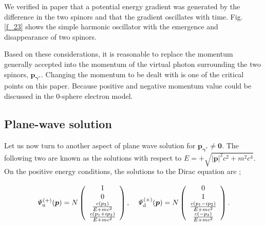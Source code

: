 \documentclass[%
 reprint,
 amsmath,amssymb,
 aps,
]{revtex4-1}
\numberwithin{equation}{section}%
\begin{document}
    We verified in paper \cite{Hanamura1} that a potential energy gradient was generated by the difference in the two spinors and that the gradient oscillates with time. Fig. \ref{f_23} shows the simple harmonic oscillator with the emergence and disappearance of two spinors.


    Based on these considerations, it is reasonable to replace the momentum generally accepted into the momentum of the virtual photon surrounding the two spinors, $ \bm{p_{\gamma^{*}}} $. Changing the momentum to be dealt with is one of the critical points on this paper. Because positive and negative momentum value could be discussed in the 0-sphere electron model. 


\subsection{
    \label{sec:Plane wave solution}
        Plane-wave solution}

    Let us now turn to another aspect of plane wave solution for $ \bm{p_{\gamma^{*}}} \neq \bm{0} $. The following two are known as the solutions with respect to $ E = + \sqrt{ |\bm{p}|^{2} c^{2} + m^{2} c^{4} } $. On the positive energy conditions, the solutions to the Dirac equation are \cite{Griffiths};

        \begin{align}
            {\it\Psi^{(+)}_{\mathrm{u}}} (\bm{p})
            = N
            \left( 
                \begin{array}{c}
                    1 \\
                    0 \\
                    \frac{c ( p_3 )}{E + m c^{2}} \\
                    \frac{c ( p_1 + i p_2 )}{E + m c^{2}} \\
                \end{array}
            \right)
            , \ \ \
            {\it\Psi^{(+)}_{\mathrm{d}}}  (\bm{p})
            = N
            \left( 
                \begin{array}{c}
                    0 \\
                    1 \\
                    \frac{c ( p_1 - i p_2 )}{E + m c^{2}} \\
                    \frac{c ( - p_3 )}{E + m c^{2}}  \\
                \end{array}
            \right)
            .
        \label{e_Psy_6}
        \end{align}
\end{document}
